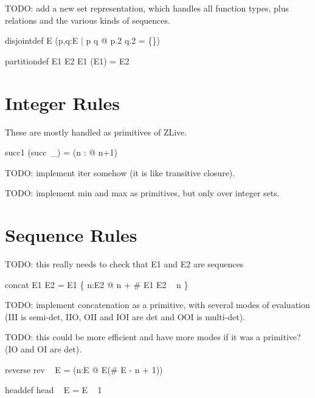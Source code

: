 \documentclass{article}
\begin{document}
TODO: add a new set representation, which handles all function types,
plus relations and the various kinds of sequences.

\begin{zedrule}{disjointdef}
   \disjoint E \iff (\forall p,q:E | p \neq q @ p.2 \cap q.2 = \{\})
\end{zedrule}

\begin{zedrule}{partitiondef}
   E1 \partition E2 \iff \disjoint E1 \land \bigcup(\ran E1) = E2
\end{zedrule}


\section{Integer Rules}

These are mostly handled as primitives of ZLive.


\begin{zedrule}{succ1}
  (succ~\_) = (\lambda n : \nat @ n+1)
\end{zedrule}

TODO: implement iter somehow (it is like transitive closure).

TODO: implement min and max as primitives, but only over integer sets.


\section{Sequence Rules}

TODO: this really needs to check that E1 and E2 are sequences
\begin{zedrule}{concat}
   E1 \cat E2 = E1 \cup \{ n:\dom E2 @ n + \# E1 \mapsto E2 ~ n \}
\end{zedrule}

TODO: implement concatenation as a primitive, with several
modes of evaluation (III is semi-det, IIO, OII and IOI are det
and OOI is multi-det).

TODO: this could be more efficient and have more modes if it
was a primitive? (IO and OI are det).
\begin{zedrule}{reverse}
   rev ~ E = (\lambda n:\dom E @ E(\# E - n + 1))
\end{zedrule}

\begin{zedrule}{headdef}
   head ~ E = E ~ 1
\end{zedrule}
\end{document}
